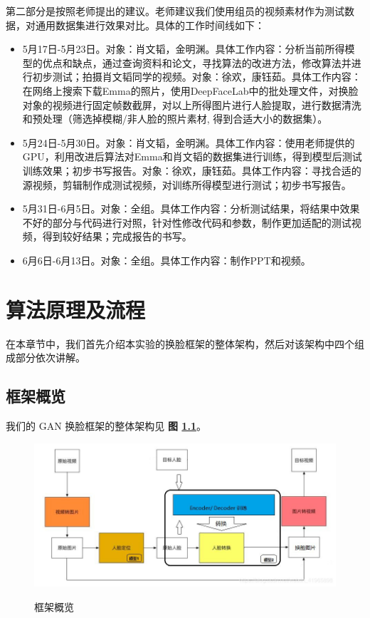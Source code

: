 第二部分是按照老师提出的建议。老师建议我们使用组员的视频素材作为测试数据，对通用数据集进行效果对比。具体的工作时间线如下：

\begin{itemize}
	\item 5月17日-5月23日。对象：肖文韬，金明渊。具体工作内容：分析当前所得模型的优点和缺点，通过查询资料和论文，寻找算法的改进方法，修改算法并进行初步测试；拍摄肖文韬同学的视频。对象：徐欢，康钰茹。具体工作内容：在网络上搜索下载Emma的照片，使用DeepFaceLab中的批处理文件，对换脸对象的视频进行固定帧数截屏，对以上所得图片进行人脸提取，进行数据清洗和预处理（筛选掉模糊/非人脸的照片素材, 得到合适大小的数据集）。
	\item 5月24日-5月30日。对象：肖文韬，金明渊。具体工作内容：使用老师提供的GPU，利用改进后算法对Emma和肖文韬的数据集进行训练，得到模型后测试训练效果；初步书写报告。对象：徐欢，康钰茹。具体工作内容：寻找合适的源视频，剪辑制作成测试视频，对训练所得模型进行测试；初步书写报告。
	\item 5月31日-6月5日。对象：全组。具体工作内容：分析测试结果，将结果中效果不好的部分与代码进行对照，针对性修改代码和参数，制作更加适配的测试视频，得到较好结果；完成报告的书写。
	\item 6月6日-6月13日。对象：全组。具体工作内容：制作PPT和视频。
\end{itemize}

\chapter{算法原理及流程}
\label{methodology}
在本章节中，我们首先介绍本实验的换脸框架的整体架构，然后对该架构中四个组成部分依次讲解。

\section{框架概览}
我们的 GAN 换脸框架的整体架构见 \textbf{图 \ref{fig:overall}}。

\begin{figure}[h!]
	\caption{框架概览}
	\centering
	\includegraphics[width=\textwidth]{overall.jpg}
	\label{fig:overall}
\end{figure}

